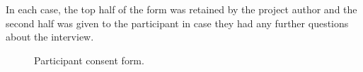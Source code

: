 \documentclass[]{scrartcl}
\begin{document}
In each case, the top half of the form was retained by the project author and
the second half was given to the participant in case they had any further
questions about the interview.

\begin{figure}[h]
  \begin{center}
  \end{center}
  \caption{Participant consent form.}
  \label{participantconsent}
\end{figure}

\newpage

\end{document}
